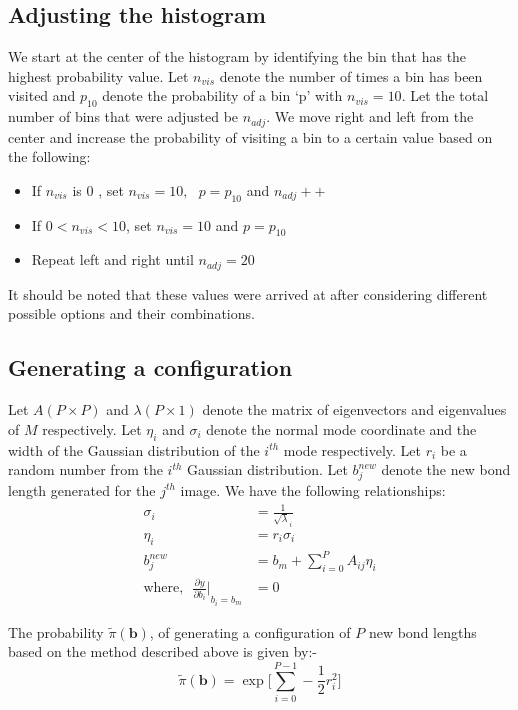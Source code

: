     \subsection{Adjusting the histogram}
        We start at the center of the histogram by identifying the bin that has the highest probability value. Let $n_{vis}$ denote the number of times a bin has been visited and $p_{10}$ denote the probability of a bin `p' with $n_{vis} = 10$. Let the total number of bins that were adjusted be $n_{adj}$. We move right and left from the center and increase the probability of visiting a bin to a certain value based on the following:
        \begin{itemize}
            \item If $n_{vis}$ is $0$ , set $n_{vis} = 10, \: \: \: p = p_{10}$ and $n_{adj}++$
            \item If $0 < n_{vis} < 10$, set $n_{vis} = 10$ and $p = p_{10}$
            \item Repeat left and right until $n_{adj} = 20$
        \end{itemize}

        It should be noted that these values were arrived at after considering different possible options and their combinations.

    \subsection{Generating a configuration}
        Let $A (P \times P)$ and $\lambda (P \times 1)$ denote the matrix of eigenvectors  and eigenvalues of $M$ respectively. Let $\eta_i$ and $\sigma_i$ denote the normal mode coordinate and the width of the Gaussian distribution of the $i^{th}$ mode respectively. Let $r_i$ be a random number from the $i^{th}$ Gaussian distribution. Let $b^{new}_j$ denote the new bond length generated for the $j^{th}$ image. We have the following relationships:
        \begin{equation}
            \begin{aligned}
                \sigma_i &= \frac{1}{\sqrt \lambda_i}\\
                \eta_i &= r_i  \sigma_i\\
                b_j^{new} &= b_m + \displaystyle\sum\limits_{i=0}^P A_{ij}  \eta_i\\
                \text{where,} \: \: \: {\frac{\partial y}{\partial b_i} \Bigg|}_{b_i = b_m} &= 0
            \end{aligned}
        \end{equation}

        The probability $\tilde \pi({\mathbf b})$, of generating a configuration of $P$ new bond lengths based on the method described above is given by:-
        \begin{equation}
            \tilde \pi({\mathbf b}) = \exp \Bigg[ \displaystyle\sum\limits_{i=0}^{P-1} - \frac{1}{2}  r_i^2 \Bigg]
        \end{equation}
